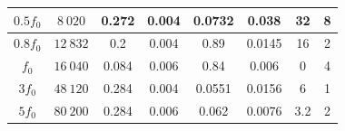 \documentclass[12pt]{article}
\begin{document}
\begin{table}[H]
{\begin{tabular}{|c|c|c|c|c|c|c|c|}
        $0.5 f_0$ & $8 \: 020$                                               & 0.272                                                      & 0.004                                                             & 0.0732                                                     & 0.038                                                             & 32                                                                        & 8                                                                                  \\ \hline
        $0.8 f_0$ & $12 \: 832$                                              & 0.2                                                        & 0.004                                                             & 0.89                                                       & 0.0145                                                            & 16                                                                        & 2                                                                                  \\ \hline
        $f_0$     & $16 \: 040$                                              & 0.084                                                      & 0.006                                                             & 0.84                                                       & 0.006                                                             & 0                                                                         & 4                                                                                  \\ \hline
        $3 f_0$   & $48 \: 120$                                              & 0.284                                                      & 0.004                                                             & 0.0551                                                     & 0.0156                                                            & 6                                                                         & 1                                                                                  \\ \hline
        $5 f_0$   & $80 \: 200$                                              & 0.284                                                      & 0.006                                                             & 0.062                                                      & 0.0076                                                            & 3.2                                                                       & 2                                                                                  \\ \hline

\end{tabular}}
\end{table}
\end{document}
